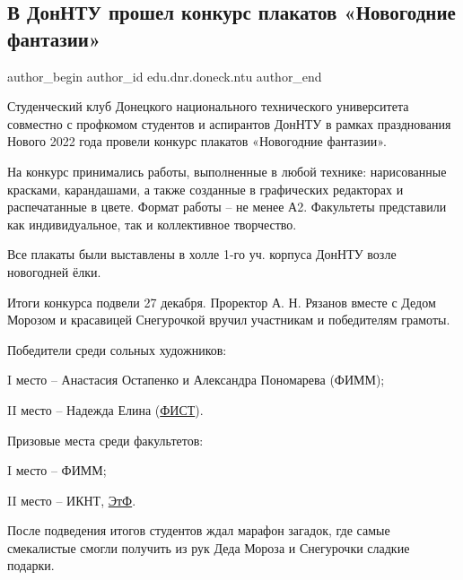  
 
 
 
 

\subsection{В ДонНТУ прошел конкурс плакатов «Новогодние фантазии»}
\label{sec:28_12_2021.stz.edu.dnr.doneck.ntu.1.konkurs_plakatov_novogodnie_fantazii}

\ifcmt
 author_begin
   author_id edu.dnr.doneck.ntu
 author_end
\fi

Студенческий клуб Донецкого национального технического университета совместно с
профкомом студентов и аспирантов ДонНТУ в рамках празднования Нового 2022 года
провели конкурс плакатов «Новогодние фантазии».


На конкурс принимались работы, выполненные в любой технике: нарисованные
красками, карандашами, а также созданные в графических редакторах и
распечатанные в цвете. Формат работы – не менее А2. Факультеты представили как
индивидуальное, так и коллективное творчество.

Все плакаты были выставлены в холле 1-го уч. корпуса ДонНТУ возле новогодней
ёлки.

Итоги конкурса подвели 27 декабря. Проректор А. Н. Рязанов вместе с Дедом
Морозом и красавицей Снегурочкой вручил участникам и победителям грамоты.


Победители среди сольных художников:

I место – Анастасия Остапенко и Александра Пономарева (ФИММ);

II место – Надежда Елина (\href{http://donntu.org/fist}{ФИСТ}).

Призовые места среди факультетов:

I место – ФИММ;

II место – ИКНТ, \href{http://donntu.org/etf}{ЭтФ}.


После подведения итогов студентов ждал марафон загадок, где самые смекалистые
смогли получить из рук Деда Мороза и Снегурочки сладкие подарки.

